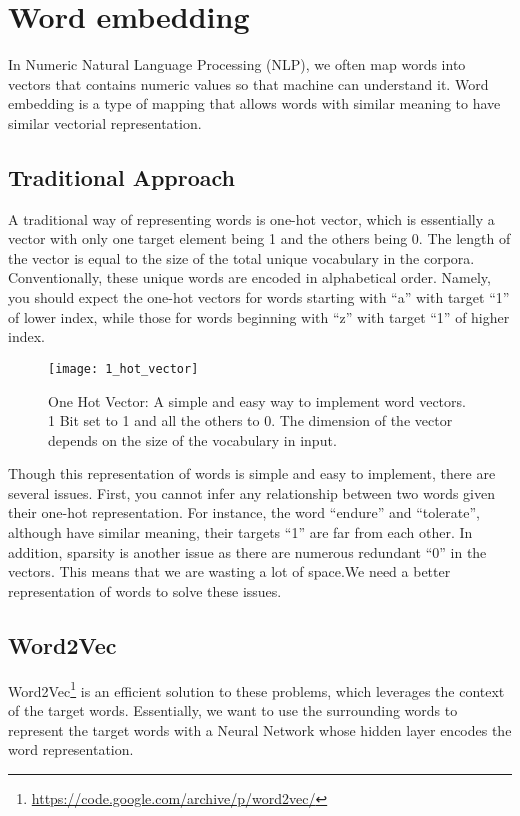 \section{Word embedding}

In Numeric Natural Language Processing (NLP), we often map words into vectors that contains numeric values so that machine can understand it. Word embedding is a type of mapping that allows words with similar meaning to have similar vectorial representation.

\subsection{Traditional Approach}

A traditional way of representing words is one-hot vector, which is essentially a vector with only one target element being 1 and the others being 0. The length of the vector is equal to the size of the total unique vocabulary in the corpora. Conventionally, these unique words are encoded in alphabetical order. Namely, you should expect the one-hot vectors for words starting with “a” with target “1” of lower index, while those for words beginning with “z” with target “1” of higher index.


\begin{figure}[ht]
    \centering
    \texttt{[image: 1\_hot\_vector]}
    \caption[One Hot vector]{One Hot Vector: A simple and easy way to implement word vectors. 1 Bit set to 1 and all the others to 0. The dimension of the vector depends on the size of the vocabulary in input.}
    \label{fig:1_hot_vector}
\end{figure}

Though this representation of words is simple and easy to implement, there are several issues. First, you cannot infer any relationship between two words given their one-hot representation. For instance, the word “endure” and “tolerate”, although have similar meaning, their targets “1” are far from each other. In addition, sparsity is another issue as there are numerous redundant “0” in the vectors. This means that we are wasting a lot of space.We need a better representation of words to solve these issues.

\subsection{Word2Vec}

Word2Vec\footnote{\url{https://code.google.com/archive/p/word2vec/}} is an efficient solution to these problems, which leverages the context of the target words. Essentially, we want to use the surrounding words to represent the target words with a Neural Network whose hidden layer encodes the word representation.

